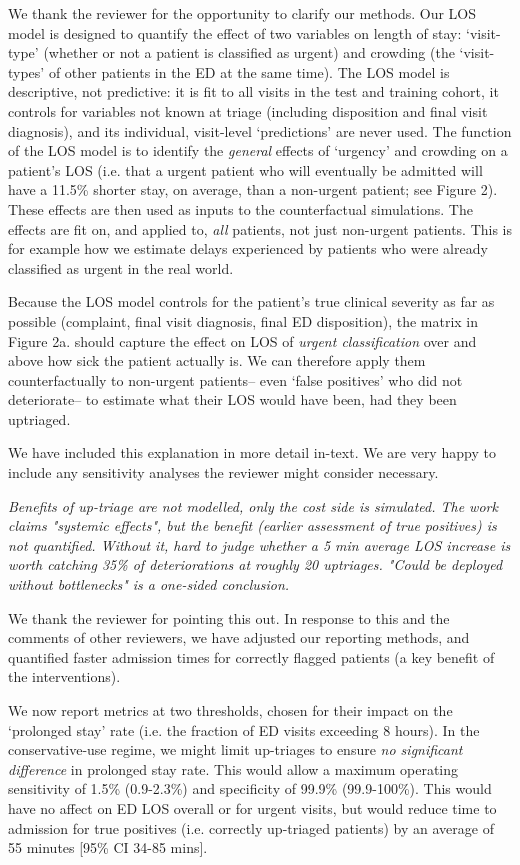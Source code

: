 We thank the reviewer for the opportunity to clarify our methods. Our LOS model is designed to quantify the effect of two variables on length of stay: `visit-type' (whether or not a patient is classified as urgent) and crowding (the `visit-types' of other patients in the ED at the same time). The LOS model is descriptive, not predictive: it is fit to all visits in the test and training cohort, it controls for variables not known at triage (including disposition and final visit diagnosis), and its individual, visit-level `predictions' are never used. The function of the LOS model is to identify the \textit{general} effects of `urgency' and crowding on a patient's LOS (i.e. that a urgent patient who will eventually be admitted will have a 11.5\% shorter stay, on average, than a non-urgent patient; see Figure 2). These effects are then used as inputs to the counterfactual simulations. The effects are fit on, and applied to, \textit{all} patients, not just non-urgent patients. This is for example how we estimate delays experienced by patients who were already classified as urgent in the real world. 

Because the LOS model controls for the patient's true clinical severity as far as possible (complaint, final visit diagnosis, final ED disposition), the matrix in Figure 2a. should capture the effect on LOS of\textit{ urgent classification} over and above how sick the patient actually is. We can therefore apply them counterfactually to non-urgent patients-- even `false positives' who did not deteriorate-- to estimate what their LOS would have been, had they been uptriaged. 

We have included this explanation in more detail in-text. We are very happy to include any sensitivity analyses the reviewer might consider necessary.

     \textit{Benefits of up-triage are not modelled, only the cost side is simulated. The work claims "systemic effects", but the benefit (earlier assessment of true positives) is not quantified. Without it, hard to judge whether a 5 min average LOS increase is worth catching 35\% of deteriorations at roughly 20 uptriages. "Could be deployed without bottlenecks" is a one-sided conclusion.}

We thank the reviewer for pointing this out. In response to this and the comments of other reviewers, we have adjusted our reporting methods, and quantified faster admission times for correctly flagged patients (a key benefit of the interventions).

We now report metrics at two thresholds, chosen for their impact on the `prolonged stay' rate (i.e. the fraction of ED visits exceeding 8 hours). In the conservative-use regime, we might limit up-triages to ensure \textit{no significant difference} in prolonged stay rate. This would allow a maximum operating sensitivity of 1.5\% (0.9-2.3\%) and specificity of 99.9\% (99.9-100\%). This would have no affect on ED LOS overall or for urgent visits, but would reduce time to admission for true positives (i.e. correctly up-triaged patients) by an average of 55 minutes [95\% CI 34-85 mins]. 

